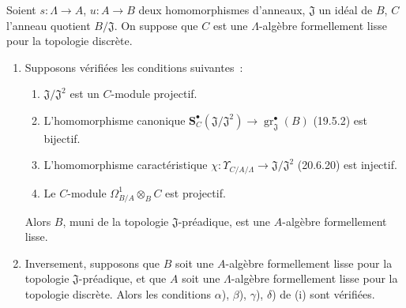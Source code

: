 \begin{theorem}[22.1.1]
\label{0.22.1.1-fr}
Soient $s:\Lambda\to A$, $u:A\to B$ deux homomorphismes d'anneaux,
$\mathfrak J$ un idéal de $B$, $C$ l'anneau quotient $B/\mathfrak J$. On
suppose que $C$ est une $\Lambda$-algèbre formellement lisse pour la topologie
discrète.
\begin{enumerate}
  \item[\textup{(i)}] Supposons vérifiées les conditions suivantes~:
  \begin{enumerate}
    \item[\textup{$\alpha$)}] $\mathfrak J/\mathfrak J^2$ est un $C$-module projectif.
    \item[\textup{$\beta$)}] L'homomorphisme canonique
    $\mathbf S_C^\bullet(\mathfrak J/\mathfrak J^2)\to
    \operatorname{gr}_{\mathfrak J}^\bullet(B)$ \textup{(19.5.2)} est bijectif.
    \item[\textup{$\gamma$)}] L'homomorphisme caractéristique
    $\chi:\Upsilon_{C/A/\Lambda}\to\mathfrak J/\mathfrak J^2$ \textup{(20.6.20)}
    est injectif.
    \item[\textup{$\delta$)}] Le $C$-module
    $\Omega^1_{B/A}\otimes_BC$ est projectif.
  \end{enumerate}
  Alors $B$, muni de la topologie $\mathfrak J$-préadique, est une
  $A$-algèbre formellement lisse.

  \item[\textup{(ii)}] Inversement, supposons que $B$ soit une $A$-algèbre
  formellement lisse pour la topologie $\mathfrak J$-préadique, et que $A$
  soit une $\Lambda$-algèbre formellement lisse pour la topologie discrète.
  Alors les conditions \textup{$\alpha$), $\beta$), $\gamma$), $\delta$)} de \textup{(i)} sont
  vérifiées.
\end{enumerate}
\end{theorem}

